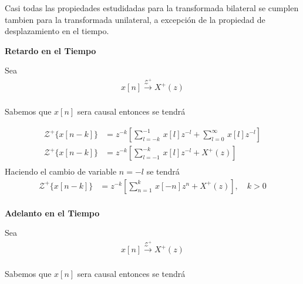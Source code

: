 \documentclass[12pt]{article}
\begin{document}
Casi todas las propiedades estudidadas para la transformada bilateral se cumplen tambien para la transformada unilateral, a excepción de la propiedad de desplazamiento en el tiempo.

\textbf{Retardo en el Tiempo}
\vspace{5mm}

Sea 
\begin{equation}
    \begin{split}
        x[n]\xrightarrow{\mathscr{Z}^+}X^+(z)\\
    \end{split}
    \label{eq:uzt_delay}
\end{equation}

Sabemos que $x[n]$ sera causal entonces se tendrá

\begin{equation}
    \begin{split}
        \mathscr{Z}^+\{x[n-k]\}&=z^{-k}[\displaystyle\sum_{l=-k}^{-1}\,x[l]z^{-l}+\displaystyle\sum_{l=0}^{\infty}\,x[l]z^{-l}]\\
        \mathscr{Z}^+\{x[n-k]\}&=z^{-k}[\displaystyle\sum_{l=-1}^{-k}\,x[l]z^{-l}+X^+(z)]\\
    \end{split}
    \label{eq:uzt_delay1}
\end{equation}
Haciendo el cambio de variable $n=-l$ se tendrá
\begin{equation}
    \begin{split}
        \mathscr{Z}^+\{x[n-k]\}&=z^{-k}[\displaystyle\sum_{n=1}^{k}\,x[-n]z^{n}+X^+(z)], \quad k>0\\
    \end{split}
    \label{eq:uzt_delay2}
\end{equation}

\textbf{Adelanto en el Tiempo}
\vspace{5mm}

Sea 
\begin{equation}
    \begin{split}
        x[n]\xrightarrow{\mathscr{Z}^+}X^+(z)\\
    \end{split}
    \label{eq:uzt_advance}
\end{equation}

Sabemos que $x[n]$ sera causal entonces se tendrá
\end{document}
